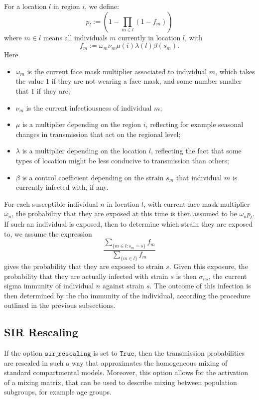 \documentclass[10pt,letterpaper]{article}
\begin{document}
For a location $l$ in region $i$, we define:
\begin{equation*}
p_l := \left(1 - \prod_{m \in l} (1 - f_m)\right)
\end{equation*}
where $m \in l$ means all individuals $m$ currently in location $l$, with
\begin{equation*}
f_m  := \omega_m \nu_m \mu(i) \lambda(l) \beta(s_m).
\end{equation*}
Here
\begin{itemize}
\item $\omega_m$ is the current face mask multiplier associated to individual $m$, which takes the value $1$ if they are not wearing a face mask, and some number smaller that $1$ if they are;
\item $\nu_m$ is the current infectiousness of individual $m$;
\item $\mu$ is a multiplier depending on the region $i$, reflecting for example seasonal changes in transmission that act on the regional level;
\item $\lambda$ is a multiplier depending on the location $l$, reflecting the fact that some types of location might be less conducive to transmission than others;
\item $\beta$ is a control coefficient depending on the strain $s_m$ that individual $m$ is currently infected with, if any.
\end{itemize}
For each susceptible individual $n$ in location $l$, with current face mask multiplier $\omega_n$, the probability that they are exposed at this time is then assumed to be $\omega_n p_l$. If such an individual is exposed, then to determine which strain they are exposed to, we assume the expression
\begin{equation*}
\frac{\sum_{\{m \in l: s_m = s\}} f_m}{\sum_{\{m \in l\}} f_m}
\end{equation*}
gives the probability that they are exposed to strain $s$. Given this exposure, the probability that they are actually infected with strain $s$ is then $\sigma_{ns}$, the current sigma immunity of individual $n$ against strain $s$. The outcome of this infection is then determined by the rho immunity of the individual, according the procedure outlined in the previous subsections.

\subsection*{SIR Rescaling}

If the option $\texttt{sir{\_}rescaling}$ is set to $\texttt{True}$, then the transmission probabilities are rescaled in such a way that approximates the homogeneous mixing of standard compartmental models. Moreover, this option allows for the activation of a mixing matrix, that can be used to describe mixing between population subgroups, for example age groups.
\end{document}
